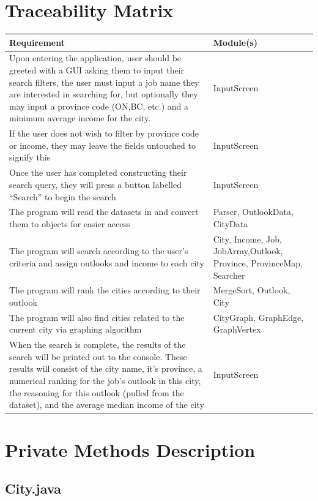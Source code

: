 \documentclass[12pt,fleqn]{article}
\begin{document}
\section*{Traceability Matrix}
\begin{tabular}{| p{10cm} | p{7cm} |}
\hline
\textbf{Requirement} & \textbf{Module(s)} \\
\hline
Upon entering the application, user should be greeted with a GUI asking them to input their search filters, the user must input a job name they are interested in searching for, but optionally they may input a province code (ON,BC, etc.) and a minimum average income for the city. & InputScreen \\
\hline
If the user does not wish to filter by province code or income, they may leave the fields untouched to signify this & InputScreen \\
\hline
Once the user has completed constructing their search query, they will press a button labelled “Search” to begin the search & InputScreen \\
\hline
The program will read the datasets in and convert them to objects for easier access & Parser, OutlookData, CityData \\
\hline
The program will search according to the user’s criteria and assign outlooks and income to each city & City, Income, Job, JobArray,Outlook, Province, ProvinceMap, Searcher\\
\hline
The program will rank the cities according to their outlook & MergeSort, Outlook, City \\
\hline
The program will also find cities related to the current city via graphing algorithm & CityGraph, GraphEdge, GraphVertex \\
\hline
When the search is complete, the results of the search will be printed out to the console. These results will consist of the city name, it’s province, a numerical ranking for the job’s outlook in this city, the reasoning for this outlook (pulled from the dataset), and the average median income of the city & InputScreen \\
\hline
\end{tabular}


\newpage

\section*{Private Methods Description}
\subsection*{City.java}\label{pcity}
\end{document}

